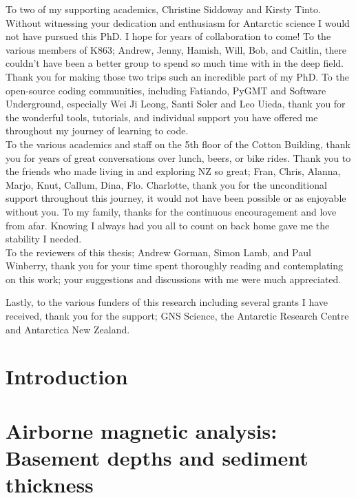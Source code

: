 \documentclass[12pt,twoside]{book}
\begin{document}
To two of my supporting academics, Christine Siddoway and Kirsty Tinto. Without witnessing your dedication and enthusiasm for Antarctic science I would not have pursued this PhD. I hope for years of collaboration to come! To the various members of K863; Andrew, Jenny, Hamish, Will, Bob, and Caitlin, there couldn't have been a better group to spend so much time with in the deep field. Thank you for making those two trips such an incredible part of my PhD. To the open-source coding communities, including Fatiando, PyGMT and Software Underground, especially Wei Ji Leong, Santi Soler and Leo Uieda, thank you for the wonderful tools, tutorials, and individual support you have offered me throughout my journey of learning to code. \\

To the various academics and staff on the 5th floor of the Cotton Building, thank you for years of great conversations over lunch, beers, or bike rides. Thank you to the friends who made living in and exploring NZ so great; Fran, Chris, Alanna, Marjo, Knut, Callum, Dina, Flo. Charlotte, thank you for the unconditional support throughout this journey, it would not have been possible or as enjoyable without you. To my family, thanks for the continuous encouragement and love from afar. Knowing I always had you all to count on back home gave me the stability I needed. \\

To the reviewers of this thesis; Andrew Gorman, Simon Lamb, and Paul Winberry, thank you for your time spent thoroughly reading and contemplating on this work; your suggestions and discussions with me were much appreciated.

Lastly, to the various funders of this research including several grants I have received, thank you for the support; GNS Science, the Antarctic Research Centre and Antarctica New Zealand.



\tableofcontents
\listoffigures
\listoftables


\chapter{Introduction}
\label{ch:1}


\chapter{Airborne magnetic analysis: Basement depths and sediment thickness}
\label{ch:2}

\end{document}
